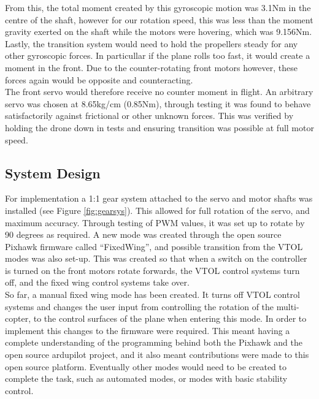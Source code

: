 From this, the total moment created by this gyroscopic motion was 3.1Nm in the centre of the shaft, however for our rotation speed, this was less than the moment gravity exerted on the shaft while the motors were hovering, which was 9.156Nm. Lastly, the transition system would need to hold the propellers steady for any other gyroscopic forces. In particullar if the plane rolls too fast, it would create a moment in the front. Due to the counter-rotating front motors however, these forces again would be opposite and counteracting.\\

The front servo would therefore receive no counter moment in flight. An arbitrary servo was chosen at 8.65kg/cm (0.85Nm), through testing it was found to behave satisfactorily against frictional or other unknown forces. This was verified by holding the drone down in tests and ensuring transition was possible at full motor speed.

\subsection{System Design}
For implementation a 1:1 gear system attached to the servo and motor shafts was installed (see Figure \ref{fig:gearsys}). This allowed for full rotation of the servo, and maximum accuracy.  Through testing of PWM values, it was set up to rotate by 90 degrees as required. A new mode was created through the open source Pixhawk firmware called “FixedWing”, and possible transition from the VTOL modes was also set-up. This was created so that when a switch on the controller is turned on the front motors rotate forwards, the VTOL control systems turn off, and the fixed wing control systems take over.\\

So far, a manual fixed wing mode has been created. It turns off VTOL control systems and changes the user input from controlling the rotation of the multi-copter, to the control surfaces of the plane when entering this mode. In order to implement this changes to the firmware were required.  This meant having  a complete understanding of the programming behind both the Pixhawk and the open source ardupilot project, and it also meant contributions were made to this open source platform. Eventually other modes would need to be created to complete the task, such as automated modes, or modes with basic stability control. \\

